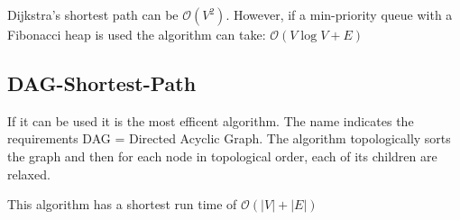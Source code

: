 Dijkstra's shortest path can be $\mathcal{O}(V^2)$. However, if a min-priority queue with a Fibonacci heap is used the algorithm can take: $\mathcal{O}(V\log{V}+E)$

\subsection{DAG-Shortest-Path}

If it can be used it is the most efficent algorithm. The name indicates the requirements DAG = Directed Acyclic Graph. 
The algorithm topologically sorts the graph and then for each node in topological order, each of its children are relaxed. 

This algorithm has a shortest run time of $\mathcal{O}(|V|+|E|)$